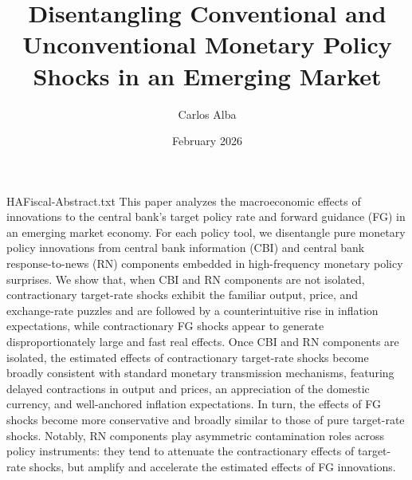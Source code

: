 \documentclass[\latexroot/\projectname]{subfiles}
\begin{document}
\webonly{
  \newcommand{\versn}{Web}
}

\title{Disentangling Conventional and Unconventional Monetary Policy Shocks in an Emerging Market}

\author{Carlos Alba\authNum}



\date{February 2026}

\maketitle
\vspace{-0.5\baselineskip}

\whenintegrated{\label{abstract}} %
\begin{verbatimwrite}{HAFiscal-Abstract.txt}
This paper analyzes the macroeconomic effects of innovations to the central bank’s target policy rate and forward guidance (FG) in an emerging market economy. For each policy tool, we disentangle pure monetary policy innovations from central bank information (CBI) and central bank response-to-news (RN) components embedded in high-frequency monetary policy surprises. We show that, when CBI and RN components are not isolated, contractionary target-rate shocks exhibit the familiar output, price, and exchange-rate puzzles and are followed by a counterintuitive rise in inflation expectations, while contractionary FG shocks appear to generate disproportionately large and fast real effects. Once CBI and RN components are isolated, the estimated effects of contractionary target-rate shocks become broadly consistent with standard monetary transmission mechanisms, featuring delayed contractions in output and prices, an appreciation of the domestic currency, and well-anchored inflation expectations. In turn, the effects of FG shocks become more conservative and broadly similar to those of pure target-rate shocks. Notably, RN components play asymmetric contamination roles across policy instruments: they tend to attenuate the contractionary effects of target-rate shocks, but amplify and accelerate the estimated effects of FG innovations.
\end{verbatimwrite}
\begin{abstract}
  
\end{abstract}
\vspace{-0.5\baselineskip}
\end{document}
